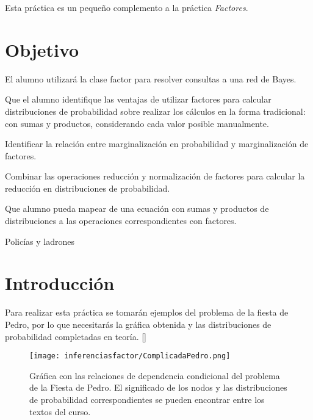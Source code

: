 
Esta práctica es un pequeño complemento a la práctica \emph{Factores}.

\section{Objetivo}

El alumno utilizará la clase factor para resolver consultas a una red de Bayes.

\begin{compactitem}
 \item Que el alumno identifique las ventajas de utilizar factores para calcular distribuciones de probabilidad sobre realizar los cálculos en la forma tradicional: con sumas y productos, considerando cada valor posible manualmente.
 
 \item Identificar la relación entre marginalización en probabilidad y marginalización de factores.
 
 \item Combinar las operaciones reducción y normalización de factores para calcular la reducción en distribuciones de probabilidad.
 
 \item Que alumno pueda mapear de una ecuación con sumas y productos de distribuciones a las operaciones correspondientes con factores.
\end{compactitem}

\begin{auxcode}
 \caption{Policías y ladrones}
 \centering
\end{auxcode}


\section{Introducción}

Para realizar esta práctica se tomarán ejemplos del problema de la fiesta de Pedro, por lo que necesitarás la gráfica obtenida y las distribuciones de probabilidad completadas en teoría. []

\begin{figure}
 \centering
 \texttt{[image: inferenciasfactor/ComplicadaPedro.png]}
 \caption{Gráfica con las relaciones de dependencia condicional del problema de la Fiesta de Pedro.  El significado de los nodos y las distribuciones de probabilidad correspondientes se pueden encontrar entre los textos del curso.}\label{Fig:GrafPedro}
\end{figure}


